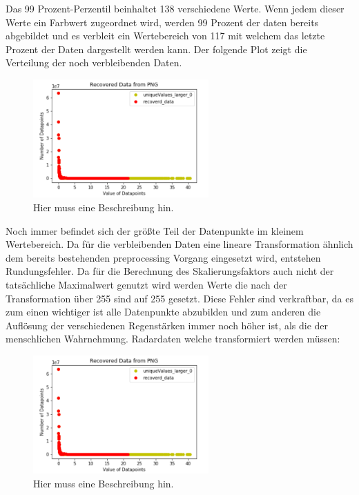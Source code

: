 Das 99 Prozent-Perzentil beinhaltet 138 verschiedene Werte. Wenn jedem dieser Werte ein Farbwert zugeordnet wird, werden 99 Prozent der daten bereits abgebildet und es verbleit ein Wertebereich von 117 mit welchem das letzte Prozent der Daten dargestellt werden kann.  
Der folgende Plot zeigt die Verteilung der noch verbleibenden Daten.

\begin{figure}[H]
 \centering
 \includegraphics[width=0.6\textwidth,angle=0]{abb/datenaufbereitung_beispiel}
 \caption[Datenaufbereitung]{Hier muss eine Beschreibung hin.}
\label{fig:datenaufbereitung}
\end{figure}

Noch immer befindet sich der größte Teil der Datenpunkte im kleinem Wertebereich. Da für die verbleibenden Daten eine lineare Transformation ähnlich dem bereits bestehenden preprocessing Vorgang eingesetzt wird, entstehen Rundungsfehler. Da für die Berechnung des Skalierungsfaktors auch nicht der tatsächliche Maximalwert genutzt wird werden Werte die nach der Transformation über 255 sind auf 255 gesetzt. Diese Fehler sind verkraftbar, da es zum einen wichtiger ist alle Datenpunkte abzubilden und zum anderen die Auflösung der verschiedenen Regenstärken immer noch höher ist, als die der menschlichen Wahrnehmung.  
Radardaten welche transformiert werden müssen:  

\begin{figure}[H]
 \centering
 \includegraphics[width=0.6\textwidth,angle=0]{abb/datenaufbereitung_beispiel}
 \caption[Datenaufbereitung]{Hier muss eine Beschreibung hin.}
\label{fig:datenaufbereitung}
\end{figure}

